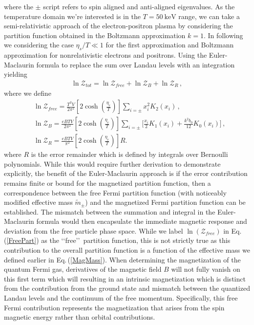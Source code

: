 \documentclass[Universe,article,submit,moreauthors,pdftex]{Definitions/mdpi}
\newcommand{\req}[1]{Eq.\,(\ref{#1})}
\begin{document}
where the $\pm$ script refers to spin aligned and anti-aligned eigenvalues. As the temperature domain we're interested is in the $T=50\ \mathrm{keV}$ range, we can take a semi-relativistic approach of the electron-positron plasma by considering the partition function obtained in the Boltzmann approximation $k=1$. In following we considering the case $\eta_s/T\ll1$ for the first approximation and Boltzmann approximation for nonrelativistic electrons and positrons. Using the Euler-Maclaurin formula to replace the sum over Landau levels with an integration yielding
\begin{align}
  \ln\mathcal{Z}_{tot}=\ln\mathcal{Z}_{free}+\ln\mathcal{Z}_B+\ln\mathcal{Z}_R\,,
\end{align}
where we define 
\begin{align}
  \label{FreePart}&\ln\mathcal{Z}_{free}=\frac{T^3V}{2\pi^2}\left[2\cosh{\left(\frac{\eta_{e}}{T}\right)}\right]\sum_{i=\pm}x_i^2K_2\left(x_i\right)\,,\\
  \label{MagPart}&\ln\mathcal{Z}_B=\frac{eBTV}{2\pi^2}\left[2\cosh{\left(\frac{\eta_{e}}{T}\right)}\right]\sum_{i=\pm}\bigg[\frac{x_i}{2}K_1\left(x_i\right)+\frac{k^2b_0}{12}K_0\left(x_i\right)\bigg]\,,\\
  \label{ErrorPart}&\ln\mathcal{Z}_R=\frac{eBTV}{\pi^2}\left[2\cosh{\left(\frac{\eta_{e}}{T}\right)}\right]R.
\end{align}
where $R$ is the error remainder which is defined by integrals over Bernoulli polynomials.
While this would require further derivation to demonstrate explicitly, the benefit of the Euler-Maclaurin approach is if the error contribution remains finite or bound for the magnetized partition function, then a correspondence between the free Fermi partition function (with noticeably modified effective mass $\tilde{m}_{\pm}$) and the magnetized Fermi partition function can be established. The mismatch between the summation and integral in the Euler-Maclaurin formula would then encapsulate the immediate magnetic response and deviation from the free particle phase space. While we label $\ln(\mathcal{Z}_{free})$ in \req{FreePart} as the \lq\lq free\rq\rq\ partition function, this is not strictly true as this contribution to the overall partition function is a function of the effective mass we defined earlier in \req{MagMass}. When determining the magnetization of the quantum Fermi gas, derivatives of the magnetic field $B$ will not fully vanish on this first term which will resulting in an intrinsic magnetization which is distinct from the contribution from the ground state and mismatch between the quantized Landau levels and the continuum of the free momentum. Specifically, this free Fermi contribution represents the magnetization that arises from the spin magnetic energy rather than orbital contributions.
\end{document}
